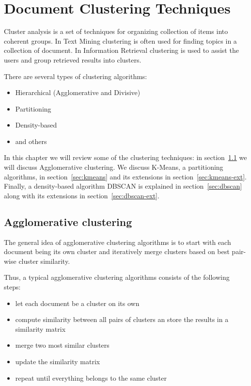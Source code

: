 \section{Document Clustering Techniques} \label{sec:doc-clustering}

Cluster analysis is a set of techniques for
organizing collection of items into coherent groups. 
In Text Mining clustering is often used for finding topics 
in a collection of document. 
In Information Retrieval clustering is used to assist the users and group 
retrieved results into clusters. 


There are several types of clustering algorithms: 

\begin{itemize}
\itemsep1pt\parskip0pt
  \item Hierarchical (Agglomerative and Divisive)
  \item Partitioning
  \item Density-based
  \item and others
\end{itemize}

In this chapter we will review some of the clustering techniques: 
in section~\ref{sec:clustering-heierarchical} we will discuss 
Agglomerative clustering. We discuss K-Means, a partitioning algorithms,
in section~\ref{sec:kmeans} and its extensions in section~\ref{sec:kmeans-ext}.
Finally, a density-based algorithm DBSCAN is explained in 
section~\ref{sec:dbscan} along with its extensions in section~\ref{sec:dbscan-ext}.


\subsection{Agglomerative clustering} \label{sec:clustering-heierarchical}

The general idea of agglomerative clustering algorithms is to start with 
each document being its own cluster and iteratively merge clusters based 
on best pair-wise cluster similarity.

Thus, a typical agglomerative clustering algorithms consists of the following steps:

\begin{itemize}
\itemsep1pt\parskip0pt
  \item let each document be a cluster on its own
  \item compute similarity between all pairs of clusters an store the 
      results in a similarity matrix
  \item merge two most similar clusters
  \item update the similarity matrix
  \item repeat until everything belongs to the same cluster
\end{itemize}


